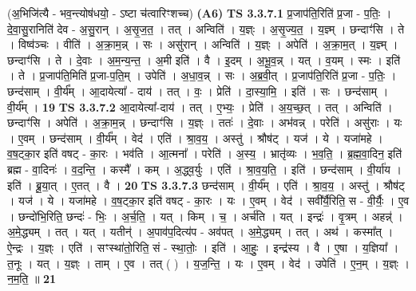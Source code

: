\documentclass[17pt]{extarticle}
\begin{document}
                      (अ॒भिजि॑त्यै - भव॒न्त्योष॑धयो॒ - ऽष्टा च॑त्वारिꣳशच्च)  \textbf{(A6)} \newline \newline
                                \textbf{ TS 3.3.7.1} \newline
                  प्र॒जाप॑ति॒रिति॑ प्र॒जा - प॒तिः॒ । दे॒वा॒सु॒रानिति॑ देव - अ॒सु॒रान् । अ॒सृ॒ज॒त॒ । तत् । अन्विति॑ । य॒ज्ञ्ः । अ॒सृ॒ज्य॒त॒ । य॒ज्ञ्म् । छन्दाꣳ॑सि । ते । विष्व॑ञ्चः । वीति॑ । अ॒क्रा॒म॒न्न् । सः । असु॑रान् । अन्विति॑ । य॒ज्ञ्ः । अपेति॑ । अ॒क्रा॒म॒त् । य॒ज्ञ्म् । छन्दाꣳ॑सि । ते । दे॒वाः । अ॒म॒न्य॒न्त॒ । अ॒मी इति॑ । वै । इ॒दम् । अ॒भू॒व॒न्न् । यत् । व॒यम् । स्मः । इति॑ । ते । प्र॒जाप॑ति॒मिति॑ प्र॒जा-प॒ति॒म् । उपेति॑ । अ॒धा॒व॒न्न् । सः । अ॒ब्र॒वी॒त् । प्र॒जाप॑ति॒रिति॑ प्र॒जा - प॒तिः॒ । छन्द॑साम् । वी॒र्य᳚म् । आ॒दायेत्या᳚ - दाय॑ । तत् । वः॒ । प्रेति॑ । दा॒स्या॒मि॒ । इति॑ । सः । छन्द॑साम् । वी॒र्य᳚म् । \textbf{  19} \newline
                  \newline
                                \textbf{ TS 3.3.7.2} \newline
                  आ॒दायेत्या᳚-दाय॑ । तत् । ए॒भ्यः॒ । प्रेति॑ । अ॒य॒च्छ॒त् । तत् । अन्विति॑ । छन्दाꣳ॑सि । अपेति॑ । अ॒क्रा॒म॒न्न् । छन्दाꣳ॑सि । य॒ज्ञ्ः । ततः॑ । दे॒वाः । अभ॑वन्न् । परेति॑ । असु॑राः । यः । ए॒वम् । छन्द॑साम् । वी॒र्य᳚म् । वेद॑ । एति॑ । श्रा॒व॒य॒ । अस्तु॑ । श्रौष॑ट् । यज॑ । ये । यजा॑महे । व॒ष॒ट्का॒र इति॑ वषट् - का॒रः । भव॑ति । आ॒त्मना᳚ । परेति॑ । अ॒स्य॒ । भ्रातृ॑व्यः । भ॒व॒ति॒ । ब्र॒ह्म॒वा॒दिन॒ इति॑ ब्रह्म - वा॒दिनः॑ । व॒द॒न्ति॒ । कस्मै᳚ । कम् । अ॒द्ध्व॒र्युः । एति॑ । श्रा॒व॒य॒ति॒ । इति॑ । छन्द॑साम् । वी॒र्या॑य । इति॑ । ब्रू॒या॒त् । ए॒तत् । वै । \textbf{  20} \newline
                  \newline
                                \textbf{ TS 3.3.7.3} \newline
                  छन्द॑साम् । वी॒र्य᳚म् । एति॑ । श्रा॒व॒य॒ । अस्तु॑ । श्रौष॑ट् । यज॑ । ये । यजा॑महे । व॒ष॒ट्का॒र इति॑ वषट् - का॒रः । यः । ए॒वम् । वेद॑ । सवी᳚र्यै॒रिति॒ स - वी॒र्यैः॒ । ए॒व । छन्दो॑भि॒रिति॒ छन्दः॑ - भिः॒ । अ॒र्च॒ति॒ । यत् । किम् । च॒ । अर्च॑ति । यत् । इन्द्रः॑ । वृ॒त्रम् । अहन्न्॑ । अ॒मे॒द्ध्यम् । तत् । यत् । यतीन्॑ । अ॒पाव॑प॒दित्य॑प - अव॑पत् । अ॒मे॒द्ध्यम् । तत् । अथ॑ । कस्मा᳚त् । ऐ॒न्द्रः । य॒ज्ञ्ः । एति॑ । सꣳस्था॑तो॒रिति॒ सं - स्था॒तोः॒ । इति॑ । आ॒हुः॒ । इन्द्र॑स्य । वै । ए॒षा । य॒ज्ञिया᳚ । त॒नूः । यत् । य॒ज्ञ्ः । ताम् । ए॒व । तत् ( ) । य॒ज॒न्ति॒ । यः । ए॒वम् । वेद॑ । उपेति॑ । ए॒न॒म् । य॒ज्ञ्ः । न॒म॒ति॒ ॥ \textbf{  21} \newline
\end{document}
